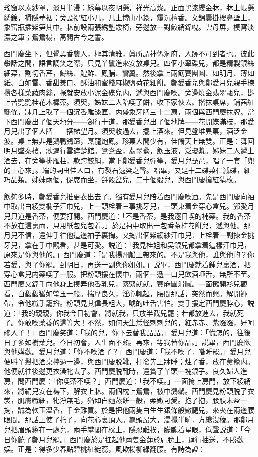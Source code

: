 瑤窗以素紗罩，淡月半浸；綉幕以夜明懸，祥光高燦。正面黑漆縷金牀，牀上帳懸綉錦，褥隱華裀；旁設褆紅小几，几上博山小篆，靄沉檀香。文錦囊掛樓鼻壁上，象窑瓶插紫笋其中。牀前設兩張綉墊矮椅，旁邊放一對鮫綃錦帨。雲母屏，模寫淡濃之筆；鴛鴦榻，高閣古今之書。

西門慶坐下，但覺異香襲人，極其清雅，眞所謂神僊洞府，人跡不可到者也。彼此攀話之間，語言調笑之際，只見丫鬟進來安放桌兒。四個小翠碟兒，都是精製銀絲細菜，割切香芹，鱘絲、鰉鮓、鳳脯、鸞羹。然後拿上兩筯賽團圓、如明月、薄如紙、白如雪、香甜羙口、酥油和蜜餞麻椒鹽荷花細餅。鄭愛香兒與鄭愛月兒親手楝攢各樣菜蔬肉絲，捲就安放小泥金碟兒内，遞與西門慶喫。旁邊燒金翡翠甌兒，斟上苦艷艷桂花木樨茶。須臾，姊妹二人陪喫了餅，收下家伙去。揩抹桌席，鋪茜紅氈條，牀几上取了一個沉香雕漆匣，内盛象牙牌三十二扇，兩個與西門慶抹牌。當下西門慶出了個天地分——劔行十道，那愛香兒出了個地牌——花開蝶滿枝，那愛月兒出了個人牌——搭梯望月。須臾收過去，擺上酒來。但見盤堆異菓，酒泛金波。桌上無非是鵝鴨鷄蹄，烹龍炮鳳。珍菓人間少有，佳餚天上無雙。正是：舞回明月墜秦樓，歌遏行雲遮楚館。鴛鴦盃，翡翠盞，飲玉液，泛瓊漿。姊妹二人遞上酒去，在旁箏排雁柱，款跨鮫綃，當下鄭愛香兒彈箏，愛月兒琵琶，唱了一套「兜的上心來」。端的詞出佳人口，有裂石遶梁之聲。唱畢，又是十二碟菓仁減碟，細巧品類。姊妹兩個，促席而坐，㧱骰盆兒，二十個骰兒，與西門慶搶紅猜枚。

飲夠多時，鄭愛香兒推更衣出去了。獨有愛月兒陪着西門慶喫酒。先是西門慶向袖中取出白綾雙欄子汗巾兒，上一頭栓着三事挑牙兒，一頭束着金穿心盒兒。鄭愛月兒只道是香茶，便要打開。西門慶道：「不是香茶，是我逐日喫的補薬。我的香茶不放在這裏面，只用紙包兒包着。」於是袖中取出一包香茶桂花餅兒，遞與他。那月兒不信，還伸手往他這邊袖子裏掏。又掏出個紫縐紗汗巾兒，上栓着一副揀金挑牙兒，拿在手中觀看，甚是可愛。説道：「我見桂姐和吴銀兒都拿着這樣汗巾兒，原來是你與他的。」西門慶道：「是我揚州船上帶來的。不是我與他，誰與他的？你若愛，與了你罷。到明日，再送一副與你姐姐。」説畢，西門慶就着鍾兒裏酒，把穿心盒兒内薬喫了一服。把粉頭摟在懷中，兩個一遞一口兒飲酒咂舌，無所不至。西門慶又舒手向他身上摸弄他香乳兒，緊緊就就，賽麻團滑膩。一面攤開衫兒觀看，白馥馥猶如瑩玉一般。揣摩良久，淫心輒起，腰間那話，突然而興。解開褲帶，令他纖手籠揝。粉頭見其偉長粗大，唬的吐舌害怕。雙手摟定西門慶脖心，説道：「我的親親，你我今日初會，將就我，只放半截兒罷；若都放進去，我就死了。你敢喫薬養的這等大！不然，如何天生恁怪剌剌兒的，紅赤赤、紫漒漒，好呵磣人子！」西門慶笑道：「我的兒，你下去替我品品。」愛月兒道：「慌怎的，往後日子多如樹葉兒。今日初會，人生面不熟。再來，等我替你品。」説畢，西門慶欲與他媾歡。愛月兒道：「你不喫酒了？」西門慶道：「我不喫了，喒睡罷。」愛月兒便呌丫鬟把酒桌擡過一邊，與西門慶脱靴，打發先上牀睡；炷了香，放在薰籠内。他便就往後邊更衣澡牝去了。西門慶脱靴時，還賞了丫頭一塊銀子。良久婦人進房，問西門慶：「你喫茶不喫？」西門慶道：「我不喫。」一面掩上房門，放下綾綃來，將絹兒安在褥下，解衣上牀。兩個枕上鴛鴦，被中鸂鶒。西門慶見粉頭脱了衣裳，肌膚纖細，牝淨無毛，猶如白麵蒸餅一般，柔嫩可愛。抱了抱，腰肢未盈一掬，誠為軟玉溫香，千金難買。於是把他兩隻白生生銀條般嫩腿兒，來夾在兩邊腰眼間。那話上使了托子，向花心裏頂入。龜頭昂大，濡攪半晌，方纔沒稜。那鄭月兒把眉頭縐在一處兒，兩手攀閣在枕上，隱忍難挨，朦朧着星眼，低聲説道：「今日你饒了鄭月兒罷。」西門慶於是扛起他兩隻金蓮於肩膀上，肆行抽送，不勝歡娱。正是：得多少春點碧桃紅綻蕊，風欺楊柳緑翻腰。有詩為證：

